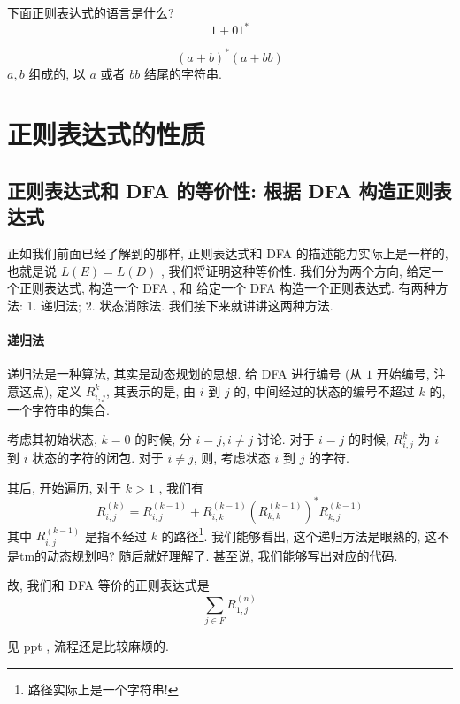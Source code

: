 \documentclass[../main.tex]{subfiles}
\begin{document}
\begin{exam}
下面正则表达式的语言是什么? 
\begin{equation}
1 + 0 1 ^{* } 
\end{equation}
\end{exam}
\begin{exam}
\begin{equation}
(a+ b ) ^{*} (a + bb ) 
\end{equation}
\(a , b\) 组成的, 以 \(a\) 或者 \(bb\) 结尾的字符串. 
\end{exam}

\newpage 
\section{正则表达式的性质}%
\subsection{正则表达式和 DFA 的等价性: 根据 DFA 构造正则表达式}

正如我们前面已经了解到的那样, 正则表达式和 DFA 的描述能力实际上是一样的, 也就是说 \(L (E ) = L ( D) \) , 我们将证明这种等价性. 我们分为两个方向, 给定一个正则表达式, 构造一个 DFA , 和 给定一个 DFA 构造一个正则表达式.   有两种方法: 1. 递归法; 2. 状态消除法. 我们接下来就讲讲这两种方法. 
\paragraph{递归法}
递归法是一种算法, 其实是动态规划的思想. 给 DFA 进行编号 (从 \(1\) 开始编号, 注意这点), 定义 \(R _{i , j} ^{k}\), 其表示的是, 由 \(i\) 到 \(j\) 的, 中间经过的状态的编号不超过 \(k\) 的, 一个字符串的集合. 

考虑其初始状态, \(k = 0\) 的时候, 分 \(i = j , i \ne j \) 讨论. 对于 \(i =j \) 的时候, \(R ^{k} _{i, j}\) 为 \(i\) 到 \(i\) 状态的字符的闭包. 对于 \(i \ne j\), 则, 考虑状态 \(i\) 到 \(j\) 的字符.

其后, 开始遍历, 对于 \(k > 1 \) , 我们有
\begin{equation}
R _{i , j } ^{ (k ) } =  R_{i, j} ^{ (k - 1)} + R _{i , k} ^{(k - 1) } ( R _{k , k} ^{ (k -1  )} ) ^{*} R _{k , j} ^{ (k - 1) }
\end{equation}
其中 \(R _{i, j} ^{ (k -1) }\) 是指不经过 \(k\) 的路径\footnote{路径实际上是一个字符串!}. 我们能够看出, 这个递归方法是眼熟的, 这不是tm的动态规划吗? 随后就好理解了.  甚至说, 我们能够写出对应的代码. 

故, 我们和 DFA 等价的正则表达式是
\begin{equation}
\sum _{j \in F} R _{1, j} ^{(n)}
\end{equation}
\begin{exam}
见 ppt , 流程还是比较麻烦的.
\end{exam}
\end{document}

